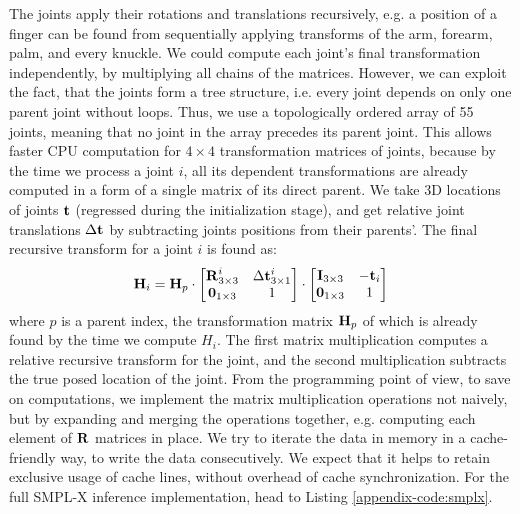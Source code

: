The joints apply their rotations and translations recursively, e.g. a position of a finger can be found from sequentially applying transforms of the arm, forearm, palm, and every knuckle. We could compute each joint's final transformation independently, by multiplying all chains of the matrices. However, we can exploit the fact, that the joints form a tree structure, i.e. every joint depends on only one parent joint without loops. Thus, we use a topologically ordered array of 55 joints, meaning that no joint in the array precedes its parent joint. This allows faster CPU computation for $4\times4$ transformation matrices of joints, because by the time we process a joint $i$, all its dependent transformations are already computed in a form of a single matrix of its direct parent. We take 3D locations of joints $\bm{\mathrm{t}}$ (regressed during the initialization stage), and get relative joint translations $\Delta\bm{\mathrm{t}}$ by subtracting joints positions from their parents'. The final recursive transform  for a joint $i$ is found as:
\begin{equation}
	\bm{\mathrm{H}}_i = 
	\bm{\mathrm{H}}_p
	\cdot
	\begin{bmatrix} 
		\bm{\mathrm{R}}^i_{3 \times 3} & \Delta\bm{\mathrm{t}}^i_{3 \times 1} \\
		\bm{\mathrm{0}}_{1 \times 3} & 1 \\
	\end{bmatrix}
	\cdot
	\begin{bmatrix} 
		\bm{\mathrm{I}}_{3\times3} & -\bm{\mathrm{t}}_i \\
		\bm{\mathrm{0}}_{1 \times 3} & 1 \\
	\end{bmatrix}
	\label{methods:eq:smplx-rodrigures-4by4}
\end{equation}
where $p$ is a parent index, the transformation matrix $\bm{\mathrm{H}}_p$ of which is already found by the time we compute $H_i$. The first matrix multiplication computes a relative recursive transform for the joint, and the second multiplication subtracts the true posed location of the joint. From the programming point of view, to save on computations, we implement the matrix multiplication operations not naively, but by expanding and merging the operations together, e.g. computing each element of $\bm{\mathrm{R}}$ matrices in place. We try to iterate the data in memory in a cache-friendly way, to write the data consecutively. We expect that it helps to retain exclusive usage of cache lines, without overhead of cache synchronization. For the full SMPL-X inference implementation, head to Listing \ref{appendix-code:smplx}.

